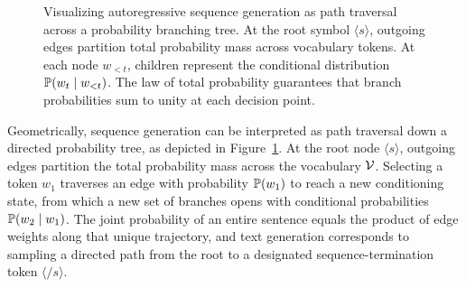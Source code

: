 \documentclass[../../main.tex]{subfiles}
\begin{document}
\begin{figure}[htbp]
\centering
{}
\caption{Visualizing autoregressive sequence generation as path traversal across a probability branching tree. At the root symbol $\langle s \rangle$, outgoing edges partition total probability mass across vocabulary tokens. At each node $w_{<t}$, children represent the conditional distribution $\mathbb{P}(w_t \mid w_{<t})$. The law of total probability guarantees that branch probabilities sum to unity at each decision point.}
\label{fig:prob_tree}
\end{figure}

Geometrically, sequence generation can be interpreted as path traversal down a directed probability tree, as depicted in Figure~\ref{fig:prob_tree}. At the root node $\langle s \rangle$, outgoing edges partition the total probability mass across the vocabulary $\mathcal{V}$. Selecting a token $w_1$ traverses an edge with probability $\mathbb{P}(w_1)$ to reach a new conditioning state, from which a new set of branches opens with conditional probabilities $\mathbb{P}(w_2 \mid w_1)$. The joint probability of an entire sentence equals the product of edge weights along that unique trajectory, and text generation corresponds to sampling a directed path from the root to a designated sequence-termination token $\langle /s \rangle$.
\end{document}
